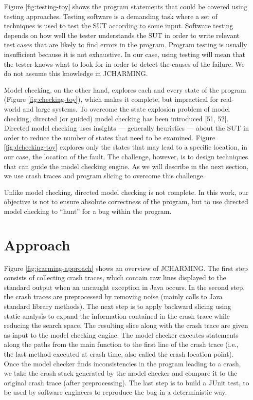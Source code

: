 \documentclass[12pt]{report}
\begin{document}
Figure \ref{fig:testing-toy} shows the program statements that could be
covered using testing approaches. Testing software is a demanding task
where a set of techniques is used to test the SUT according to some
input. Software testing depends on how well the tester understands the
SUT in order to write relevant test cases that are likely to find errors
in the program. Program testing is usually insufficient because it is
not exhaustive. In our case, using testing will mean that the tester
knows what to look for in order to detect the causes of the failure. We
do not assume this knowledge in JCHARMING.

Model checking, on the other hand, explores each and every state of the
program (Figure \ref{fig:checking-toy}), which makes it complete, but
impractical for real-world and large systems. To overcome the state
explosion problem of model checking, directed (or guided) model checking
has been introduced {[}51, 52{]}. Directed model checking uses insights
--- generally heuristics --- about the SUT in order to reduce the number
of states that need to be examined. Figure \ref{fig:dchecking-toy}
explores only the states that may lead to a specific location, in our
case, the location of the fault. The challenge, however, is to design
techniques that can guide the model checking engine. As we will describe
in the next section, we use crash traces and program slicing to overcome
this challenge.

Unlike model checking, directed model checking is not complete. In this
work, our objective is not to ensure absolute correctness of the
program, but to use directed model checking to ``hunt'' for a bug within
the program.

\section{\texorpdfstring{Approach\label{sec:jcharming}}{Approach}}\label{approach-4}

Figure \ref{fig:jcarming-approach} shows an overview of JCHARMING. The
first step consists of collecting crash traces, which contain raw lines
displayed to the standard output when an uncaught exception in Java
occurs. In the second step, the crash traces are preprocessed by
removing noise (mainly calls to Java standard library methods). The next
step is to apply backward slicing using static analysis to expand the
information contained in the crash trace while reducing the search
space. The resulting slice along with the crash trace are given as input
to the model checking engine. The model checker executes statements
along the paths from the main function to the first line of the crash
trace (i.e., the last method executed at crash time, also called the
crash location point). Once the model checker finds inconsistencies in
the program leading to a crash, we take the crash stack generated by the
model checker and compare it to the original crash trace (after
preprocessing). The last step is to build a JUnit test, to be used by
software engineers to reproduce the bug in a deterministic way.
\end{document}
